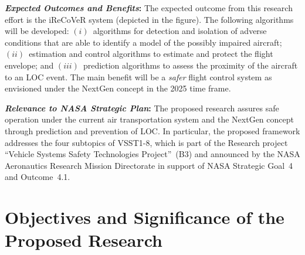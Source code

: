\documentclass[letter,onecolumn,12pt]{aiaa-tc}
\begin{document}
\medskip

\textbf{\emph{Expected Outcomes and Benefits}:} The expected outcome from this research effort is the iReCoVeR system (depicted in the figure). The following algorithms will be developed: $(i)$~algorithms for detection and isolation of adverse conditions that are able to identify a model of the possibly impaired aircraft; $(ii)$~estimation and control algorithms to estimate and protect the flight envelope; and $(iii)$~prediction algorithms to assess the proximity of the aircraft to an LOC event. The main benefit will be a \emph{safer} flight control system as envisioned under the NextGen concept in the 2025 time frame.


\medskip

\textbf{\emph{Relevance to NASA Strategic Plan}:} The proposed research assures safe operation under the current air transportation system and the NextGen concept through prediction and prevention of LOC. In particular, the proposed framework addresses the four subtopics of \mbox{VSST1-8}, which is part of the Research project ``Vehicle Systems Safety Technologies Project''~(B3) and announced by the NASA Aeronautics Research Mission Directorate in support of NASA Strategic Goal~4 and Outcome~4.1.




\section{Objectives and Significance of the Proposed Research}
\end{document}
